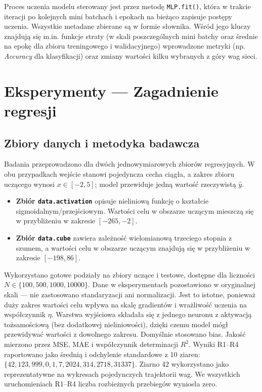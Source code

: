 \documentclass[11pt,a4paper]{article}
\begin{document}
Proces uczenia modelu sterowany jest przez metodę \texttt{MLP.fit()}, która w trakcie iteracji po kolejnych mini batchach i epokach na bieżąco zapisuje
postępy uczenia. Wszystkie metadane zbierane są w formie słownika. Wśród jego kluczy znajdują się m.in. funkcje straty 
(w skali poszczególnych mini batchy oraz średnie na epokę dla zbioru treningowego i walidacyjnego)
    wprowadzone metryki (np. \textit{Accuracy} dla klasyfikacji) oraz zmiany wartości kilku wybranych z góry wag sieci.

\section{Eksperymenty — Zagadnienie regresji}

\subsection{Zbiory danych i metodyka badawcza}
Badania przeprowadzono dla dwóch jednowymiarowych zbiorów regresyjnych. W obu przypadkach wejście stanowi pojedyncza cecha ciągła, a zakres zbioru uczącego wynosi $x \in [-2,5]$; model przewiduje jedną wartość rzeczywistą $\hat{y}$.
\begin{itemize}
    \item \textbf{Zbiór \texttt{data.activation}} opisuje nieliniową funkcję o kształcie sigmoidalnym/przejściowym. Wartości celu w obszarze uczącym mieszczą się w przybliżeniu w zakresie $[-265,-2]$.
    \item \textbf{Zbiór \texttt{data.cube}} zawiera zależność wielomianową trzeciego stopnia z szumem, a wartości celu w obszarze uczącym znajdują się w przybliżeniu w zakresie $[-198,86]$.
\end{itemize}
Wykorzystano gotowe podziały na zbiory uczące i testowe, dostępne dla liczności $N \in \{100,500,1000,10000\}$. Dane w eksperymentach pozostawiono w oryginalnej skali — nie zastosowano standaryzacji ani normalizacji. Jest to istotne, ponieważ duży zakres wartości celu wpływa na skalę gradientów i wrażliwość uczenia na współczynnik $\eta$.
Warstwa wyjściowa składała się z jednego neuronu z aktywacją tożsamościową (bez dodatkowej nieliniowości), dzięki czemu model mógł przewidywać wartości z dowolnego zakresu. Domyślnie stosowano bias. Jakość mierzono przez MSE, MAE i współczynnik determinacji $R^2$. Wyniki R1--R4 raportowano jako średnią i odchylenie standardowe z 10 ziaren: $\{42,123,999,0,1,7,2024,314,2718,31337\}$. Ziarno 42 wykorzystano jako reprezentatywne na wykresach pojedynczych trajektorii wag. We wszystkich uruchomieniach R1--R4 liczba rozbieżnych przebiegów wyniosła zero.
\end{document}

